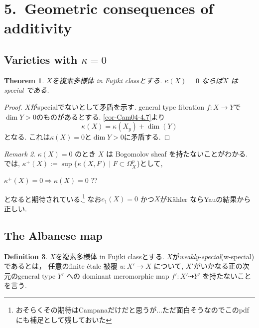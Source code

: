 \documentclass[dvipdfmx,a4paper,11pt]{article} %
\newtheorem{thm}{Theorem}[section]
\theoremstyle{definition}
\newtheorem{defn}[thm]{Definition}
\theoremstyle{remark}
\newtheorem{rem}[thm]{Remark}
\numberwithin{equation}{section}
\begin{document}
\section{5.\ Geometric consequences of additivity}
\subsection{Varieties with \(\kappa = 0\) \cite[5.1]{Cam04}}


\begin{thm}\cite[Theorem 5.1]{Cam04}
\label{thm-Cam04-5.1}
$X$を複素多様体 in Fujiki classとする.
\(\kappa(X)=0\) ならば\(X\) は special である.
\end{thm}

\begin{proof}
$X$がspecialでないとして矛盾を示す.
general type fibration \(f : X \to Y\)で$\dim Y>0$のものがあるとする. 
\ref{cor-Cam04-4.7}より
\[
\kappa(X) =\kappa(X_y) + \dim(Y)
\]
となる. 
これは\(\kappa(X)=0\)と$\dim Y>0$に矛盾する. 
\end{proof}

\begin{rem}\cite[Remark 5.2]{Cam04}
\( \kappa(X)=0 \) のとき \( X \) は Bogomolov sheaf を持たないことがわかる. 
\cite{Cam95}では, $\kappa^+(X) := \sup\{ \kappa(X, F) \mid F \subset \Omega_X^p\}$として, 
\begin{center}
$\kappa^+(X) =0 \Rightarrow \kappa(X) =0$ ??
\end{center}
となると期待されている.\footnote{おそらくその期待はCampanaだけだと思うが...ただ面白そうなのでこのpdfにも補足として残しておいた}
なお\( c_1(X)=0 \) かつ\( X \)がKähler ならYauの結果から正しい. 
\end{rem}

\subsection{The Albanese map \cite[5.2]{Cam04}}

\begin{defn}\cite[Definition 9.26]{Cam04}
\label{defn-Cam04-9.26}
$X$を複素多様体 in Fujiki classとする. 
$X$が\emph{weakly-special}(w-special)であるとは， 任意のfinite étale 被覆 \(u : X' \to X\) について,  
$X'$がいかなる正の次元のgeneral type \(Y'\) への dominant meromorphic map \(f' : X' \dashrightarrow Y'\) を持たないことを言う. 
\end{defn}
\end{document}
